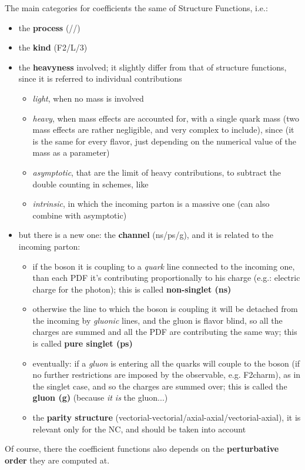 The main categories for coefficients the same of Structure Functions, i.e.:
\begin{itemize}
\item the \textbf{process} (\elmag/\nc/\cc)
\item the \textbf{kind} (F2/L/3)
\item the \textbf{heavyness} involved; it slightly differ from that of
  structure functions, since it is referred to individual contributions
  \begin{itemize}
    \item \textit{light}, when no mass is involved
    \item \textit{heavy}, when mass effects are accounted for, with a single
      quark mass (two mass effects are rather negligible, and very complex to
      include), since (it is the same for every flavor, just depending on the
      numerical value of the mass as a parameter)
    \item \textit{asymptotic}, that are the limit of heavy contributions, to
      subtract the double counting in \gmvfns schemes, like \fonll
    \item \textit{intrinsic}, in which the incoming parton is a massive one
      (can also combine with asymptotic)
  \end{itemize}
\item but there is a new one: the \textbf{channel} (ns/ps/g), and it is related to the
  incoming parton:
  \begin{itemize}
    \item if the \ew boson it is coupling to a \textit{quark} line connected to the incoming
      one, than each PDF it's contributing proportionally to his charge (e.g.:
      electric charge for the photon); this is called \textbf{non-singlet (ns)}
    \item otherwise the line to which the \ew boson is coupling it will be detached
      from the incoming  by \textit{gluonic} lines, and the gluon is flavor blind, so
      all the charges are summed and all the PDF are contributing the same way;
      this is called \textbf{pure singlet (ps)}
    \item eventually: if a \textit{gluon} is entering all the quarks will couple to the \ew
      boson (if no further restrictions are imposed by the observable, e.g.
      F2charm), as in the singlet case, and so the charges are summed over; this
      is called the \textbf{gluon (g)} (because \textit{it is} the gluon...)
    \item the \textbf{parity structure}
      (vectorial-vectorial/axial-axial/vectorial-axial), it is relevant only for
      the NC, and should be taken into account
  \end{itemize}
\end{itemize}
Of course, there the coefficient functions also depends on the
\textbf{perturbative order} they are computed at.

